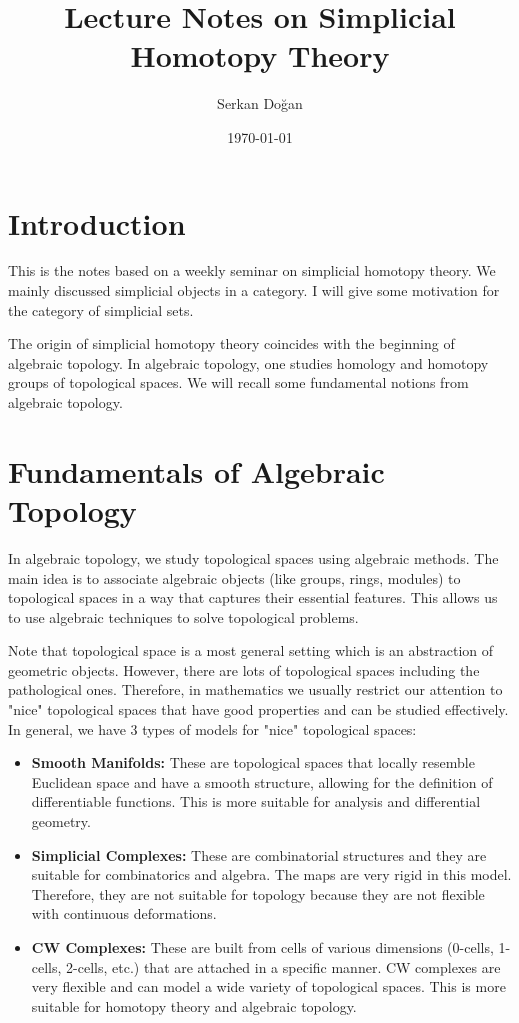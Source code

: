 \documentclass[11pt]{article}
\title{Lecture Notes on Simplicial Homotopy Theory}
\author{Serkan Doğan}
\date{\today}
\theoremstyle{definition}
\theoremstyle{plain}
\begin{document}
\maketitle

\tableofcontents

\section{Introduction}
This is the notes based on a weekly  seminar on simplicial homotopy theory. We mainly discussed simplicial objects in a category. I will give some motivation for the category of simplicial sets.

The origin of simplicial homotopy theory coincides with the beginning of algebraic topology. In algebraic topology, one studies homology and homotopy groups of topological spaces. We will recall some fundamental notions from algebraic topology.

\section{Fundamentals of Algebraic Topology}

In algebraic topology, we study topological spaces using algebraic methods. The main idea is to associate algebraic objects (like groups, rings, modules) to topological spaces in a way that captures their essential features. This allows us to use algebraic techniques to solve topological problems.

Note that topological space is a most general setting which is an abstraction of geometric objects. However, there are lots of topological spaces including the pathological ones. Therefore, in mathematics we usually restrict our attention to "nice" topological spaces that have good properties and can be studied effectively.
In general, we have 3 types of models for "nice" topological spaces:

\begin{itemize}
    \item \textbf{Smooth Manifolds:} These are topological spaces that locally resemble Euclidean space and have a smooth structure, allowing for the definition of differentiable functions. This is more suitable for analysis and differential geometry.
    \item \textbf{Simplicial Complexes:} These are combinatorial structures and they are suitable for combinatorics and algebra. The maps are very rigid in this model. Therefore, they are not suitable for topology because they are not flexible with continuous deformations.
    \item \textbf{CW Complexes:} These are built from cells of various dimensions (0-cells, 1-cells, 2-cells, etc.) that are attached in a specific manner. CW complexes are very flexible and can model a wide variety of topological spaces. This is more suitable for homotopy theory and algebraic topology.
\end{itemize}
\end{document}
